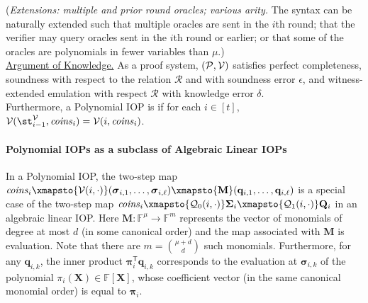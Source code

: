 \begin{definition}
(\emph{Extensions: multiple and prior round oracles; various arity.} The syntax can be naturally extended such that multiple oracles are sent in the $i$th round; that the verifier may query oracles sent in the $i$th round or earlier; or that some of the oracles are polynomials in fewer variables than $\mu$.) \\ 

\noindent \underline{Argument of Knowledge.} As a proof system, $(\mathcal{P}, \mathcal{V})$ satisfies perfect completeness, soundness with respect to the relation $\mathcal{R}$ and with soundness error $\epsilon$, and witness-extended emulation with respect $\mathcal{R}$ with knowledge error $\delta$. \\

Furthermore, a Polynomial IOP is  if for each $i \in [t]$, $\mathcal{V}(\st^\verifier_{i-1}, \mathit{coins}_i) = \mathcal{V}(i, \mathit{coins}_i)$. 
\end{definition}

\paragraph{Polynomial IOPs as a subclass of Algebraic Linear IOPs}

In a Polynomial IOP, the two-step map $\mathit{coins}_i \xmapsto{\verifier(i, \cdot)} (\boldsymbol{\sigma}_{i,1}, \ldots, \boldsymbol{\sigma}_{i,\ell}) \xmapsto{\mathbf{M}} (\mathbf{q}_{i,1}, \ldots, \mathbf{q}_{i,\ell})$ is a special case of the two-step map $\mathit{coins}_i \xmapsto{\qgen_0(i, \cdot)} \boldsymbol{\Sigma}_i \xmapsto{\qgen_1(i, \cdot)} \mathbf{Q}_i$ in an algebraic linear IOP. Here $\mathbf{M} : \mathbb{F}^{\mu} \rightarrow \mathbb{F}^{m}$ represents the vector of monomials of degree at most $d$ (in some canonical order) and the map associated with $\mathbf{M}$ is evaluation. Note that there are $m = {\mu + d \choose d}$ such monomials. Furthermore, for any $\mathbf{q}_{i,k}$, the inner product $\boldsymbol{\pi}_i^\mathsf{T} \mathbf{q}_{i,k}$ corresponds to the evaluation at $\boldsymbol{\sigma}_{i,k}$ of the polynomial $\pi_i(\mathbf{X}) \in \mathbb{F}[\mathbf{X}]$, whose coefficient vector (in the same canonical monomial order) is equal to $\boldsymbol{\pi}_i$.


